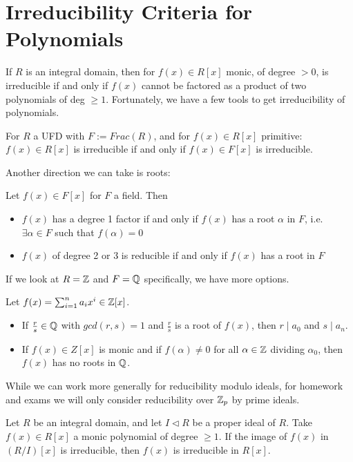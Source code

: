 \documentclass{memoir}
\begin{document}


\section{Irreducibility Criteria for Polynomials}
\label{sec:irreducibility_criteria_for_polynomials}

If \(R\) is an integral domain, then for \(f(x) \in R[x]\) monic, of degree \(>0\), is irreducible if and only if \(f(x)\) cannot be factored as a product of two polynomials of deg \(\geq 1\).
Fortunately, we have a few tools to get irreducibility of polynomials.

\begin{lemma}
	For \(R\) a UFD with \(F:= Frac(R)\), and for \(f(x) \in R[x]\) primitive:\\
	\(f(x) \in R[x]\) is irreducible if and only if \(f(x) \in F[x]\) is irreducible.
\end{lemma}
Another direction we can take is roots:
\begin{prop}
	Let \(f(x) \in F[x]\) for \(F \) a field. Then
	\begin{itemize}
		\item \(f(x)\) has a degree 1 factor if and only if \(f(x)\) has a root \(\alpha\) in \(F\), i.e. \(\exists \alpha \in F\) such that \(f(\alpha)=0\) 
		\item \(f(x)\) of degree 2 or 3 is reducible if and only if \(f(x)\) has a root in \(F\)
	\end{itemize}
\end{prop}
If we look at \(R = \mathbb{Z}\) and \(F = \mathbb{Q}\) specifically, we have more options.
\begin{prop}
	Let \(f(x) = \sum_{i=1}^{n} a_i x^{i} \in \mathbb{Z}[x]\). 
\begin{itemize}
	\item If \(\frac{r}{s}\in \mathbb{Q}\) with \(gcd(r,s) = 1\) and \(\frac{r}{s}\) is a root of \(f(x)\), then \(r\mid a_0\) and \(s\mid a_n\).
	\item If \(f(x) \in Z[x]\) is monic and if \(f(\alpha)\neq 0\) for all \(\alpha \in \mathbb{Z}\) dividing \(\alpha_0\), then \(f(x)\) has no roots in \(\mathbb{Q}\).
\end{itemize}
\end{prop}
While we can work more generally for reducibility modulo ideals, for homework and exams we will only consider reducibility over \(\mathbb{Z}_p\) by prime ideals.
\begin{prop}
	Let \(R\) be an integral domain, and let \(I \triangleleft R\) be a proper ideal of \(R\). Take \(f(x) \in R[x]\) a monic polynomial of degree \(\geq 1\). If the image of \(f(x)\) in \((R / I)[x]\) is irreducible, then \(f(x)\) is irreducible in \(R[x]\).
\end{prop}
\end{document}
